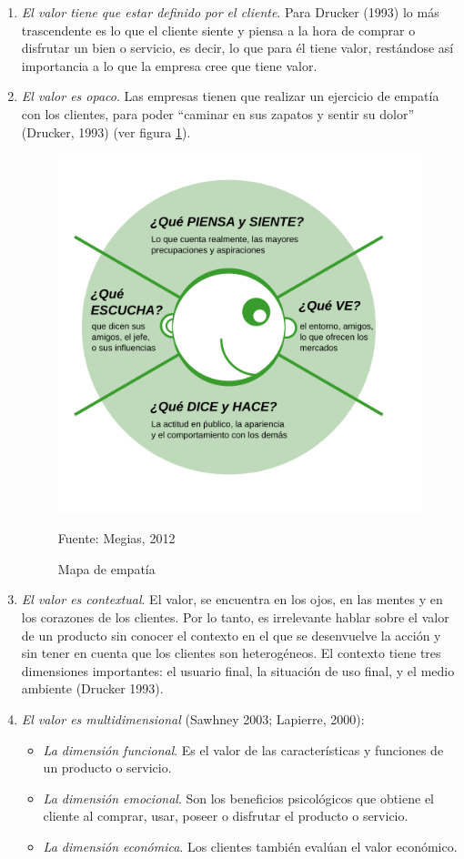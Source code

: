 \begin{enumerate}
	\item \emph{El valor tiene que estar definido por el cliente}. Para Drucker (1993) lo más trascendente es lo que el cliente siente y piensa a la hora de comprar o disfrutar un bien o servicio, es decir, lo que para él tiene valor, restándose así importancia a lo que la empresa cree que tiene valor.
	\item \emph {El valor es opaco}. Las empresas tienen que realizar un ejercicio de empatía con los clientes, para poder “caminar en sus zapatos y sentir su dolor” (Drucker, 1993) (ver figura \ref{fig:empatiaMaegias}).
	\begin{figure}[!h]
	\caption{Mapa de empatía}
	\centering \includegraphics[width=110mm]{capitulos/graficos/empatiaMaegias}
	\label{fig:empatiaMaegias}

		\footnotesize
		Fuente: Megias, 2012
\end{figure}
	\item \emph {El valor es contextual}. El valor, se encuentra en los ojos, en las mentes y en los corazones de los clientes. Por lo tanto, es irrelevante hablar sobre el valor de un producto sin conocer el contexto en el que se desenvuelve la acción y sin tener en cuenta que los clientes son heterogéneos. El contexto tiene tres dimensiones importantes: el usuario final, la situación de uso final, y el medio ambiente (Drucker 1993).
	\item \emph {El valor es multidimensional} (Sawhney 2003; Lapierre, 2000):
		\begin{itemize}
			\item \emph{La dimensión funcional}. Es el valor de las características y funciones de un producto o servicio.
			\item \emph{La dimensión emocional}. Son los beneficios psicológicos que obtiene el cliente al comprar, usar, poseer o disfrutar el producto o servicio.
			\item  \emph{La dimensión económica}. Los clientes también evalúan el valor económico.


\end{itemize}
\end{enumerate}
